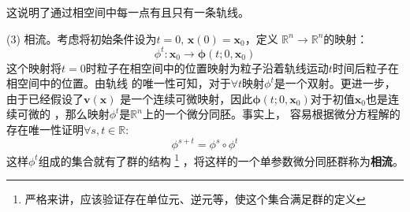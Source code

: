     这说明了通过相空间中每一点有且只有一条轨线。
    \par (3) 相流。考虑将初始条件设为$t=0,\, \bm{x}(0) = \bm{x}_0$，定义
    $\mathbb{R}^n \to \mathbb{R}^n$的映射：
    \begin{equation}
        \phi^{t}: \bm{x}_{0} \to \bm{\phi}(t; 0, \bm{x}_0)
    \end{equation}
    这个映射将$t=0$时粒子在相空间中的位置映射为粒子沿着轨线运动$t$时间后粒子在相空间中的位置。由轨线
    的唯一性可知，对于$\forall t$映射$\phi^t$是一个双射。更进一步，由于已经假设了$\bm{v}(\bm{x})$
    是一个连续可微映射，因此$\bm{\phi}(t; 0, \bm{x}_0)$对于初值$\bm{x}_0$也是连续可微的
    \cite{丁同仁2004常微分方程教程2}，那么映射$\phi^t$是$\mathbb{R}^n$上的一个微分同胚。事实上，
    容易根据微分方程解的存在唯一性证明$\forall s, t\in \mathbb{R}$:
    \begin{equation}
        \phi^{s + t} = \phi^s\circ\phi^{t}
        \label{def of phase flow}
    \end{equation}
    这样$\phi^t$组成的集合就有了群的结构
    \footnote{严格来讲，应该验证存在单位元、逆元等，使这个集合满足群的定义}
    ，将这样的一个单参数微分同胚群称为\textbf{相流}。

